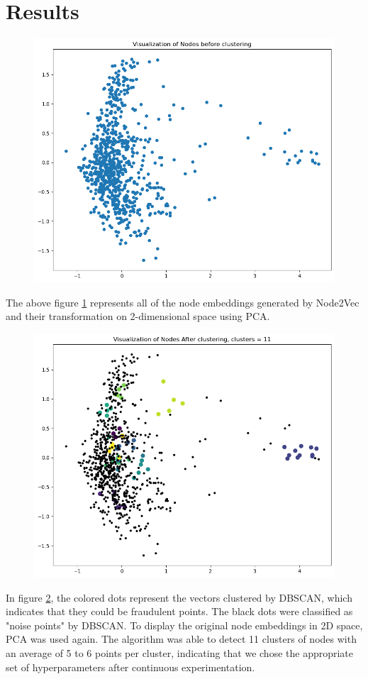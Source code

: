 \documentclass[12pt,a4paper]{article}
\begin{document}
\section{Results}
    \begin{figure}[H]
    \centering
    \label{fig:woclusters}
    \includegraphics[width=12cm]{woclustering.png}
    \end{figure}
    The above figure \ref{fig:woclusters} represents all of the node embeddings generated by Node2Vec and their transformation on 2-dimensional space using PCA.
    \begin{figure}[H]
    \centering
    \label{fig:clusters}
    \includegraphics[width=12cm]{clustering.png}
    \end{figure}
   In figure \ref{fig:clusters}, the colored dots represent the vectors clustered by DBSCAN, which indicates that they could be fraudulent points. The black dots were classified as "noise points" by DBSCAN. To display the original node embeddings in 2D space, PCA was used again. The algorithm was able to detect 11 clusters of nodes with an average of 5 to 6 points per cluster, indicating that we chose the appropriate set of hyperparameters after continuous experimentation.
\end{document}
